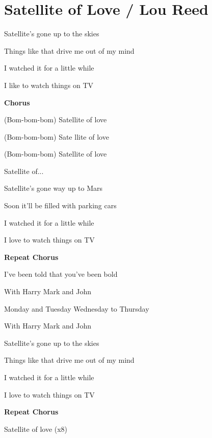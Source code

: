 \section{Satellite of Love / Lou Reed}\label{sec:satelliteoflove}

\Gmajor
\Aseven
\Cmajor
\Aminor
\Dseven
\EminorEasy
\Fmajor
\DmajorEasy


 Satellite's  gone up to the  skies 

 Things like that  drive me out of my  mind 

 I watched it  for a  little while

 I like to watch things on  TV

\textbf{Chorus}

 (Bom-bom-bom) Satellite of love

 (Bom-bom-bom) Sate llite of love

 (Bom-bom-bom) Satellite of love 

 Satellite  of...

 Satellite's  gone way up to  Mars 

 Soon it'll be  filled with parking  cars 

 I watched it  for a  little while 

I love to watch things on  TV

\textbf{Repeat Chorus}

 I've been  told that  you've been  bold

With  Harry  Mark and  John

 Monday and Tuesday  Wednesday to  Thursday

With  Harry  Mark and  John

 Satellite's  gone up to the  skies 

 Things like that  drive me out of my  mind 

 I watched it  for a  little while

 I love to watch things on  TV

\textbf{Repeat Chorus}

   

Satellite of  love  (x8)

